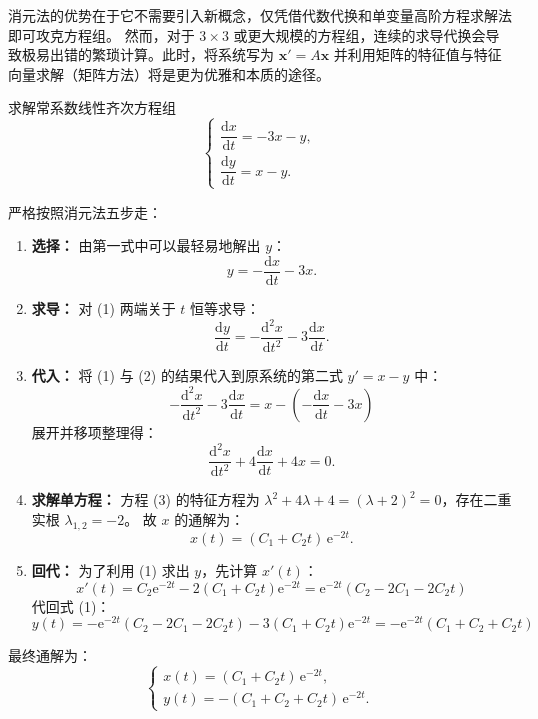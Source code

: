 \documentclass[lang=cn,11pt]{elegantbook}
\begin{document}
\begin{note}[消元法的局限与矩阵法的前瞻]
消元法的优势在于它不需要引入新概念，仅凭借代数代换和单变量高阶方程求解法即可攻克方程组。
然而，对于 $3 \times 3$ 或更大规模的方程组，连续的求导代换会导致极易出错的繁琐计算。此时，将系统写为 $\mathbf{x}'=A\mathbf{x}$ 并利用矩阵的特征值与特征向量求解（矩阵方法）将是更为优雅和本质的途径。
\end{note}


\begin{exercise} \label{ex:sys-elim-ex1}
求解常系数线性齐次方程组
\[
\begin{cases}
\dfrac{\mathrm{d}x}{\mathrm{d}t}=-3x-y,\\[6pt]
\dfrac{\mathrm{d}y}{\mathrm{d}t}=x-y.
\end{cases}
\]
\end{exercise}
\begin{solution}
严格按照消元法五步走：
\begin{enumerate}
    \item \textbf{选择：} 由第一式中可以最轻易地解出 $y$：
    \[
    y=-\frac{\mathrm{d}x}{\mathrm{d}t}-3x. \tag{1}
    \]
    \item \textbf{求导：} 对 (1) 两端关于 $t$ 恒等求导：
    \[
    \frac{\mathrm{d}y}{\mathrm{d}t}=-\frac{\mathrm{d}^{2}x}{\mathrm{d}t^{2}}-3\frac{\mathrm{d}x}{\mathrm{d}t}. \tag{2}
    \]
    \item \textbf{代入：} 将 (1) 与 (2) 的结果代入到原系统的第二式 $y'=x-y$ 中：
    \[
    -\frac{\mathrm{d}^{2}x}{\mathrm{d}t^{2}}-3\frac{\mathrm{d}x}{\mathrm{d}t} = x-\left(-\frac{\mathrm{d}x}{\mathrm{d}t}-3x\right)
    \]
    展开并移项整理得：
    \[
    \frac{\mathrm{d}^{2}x}{\mathrm{d}t^{2}}+4\frac{\mathrm{d}x}{\mathrm{d}t}+4x=0. \tag{3}
    \]
    \item \textbf{求解单方程：} 方程 (3) 的特征方程为 $\lambda^{2}+4\lambda+4=(\lambda+2)^{2}=0$，存在二重实根 $\lambda_{1,2}=-2$。
    故 $x$ 的通解为：
    \[
    x(t)=(C_1+C_2t)\,\mathrm{e}^{-2t}. \tag{4}
    \]
    \item \textbf{回代：} 为了利用 (1) 求出 $y$，先计算 $x'(t)$：
    \[
    x'(t) = C_2\mathrm{e}^{-2t} - 2(C_1+C_2t)\mathrm{e}^{-2t} = \mathrm{e}^{-2t}(C_2 - 2C_1 - 2C_2t)
    \]
    代回式 (1)：
    \[
    y(t) = -\mathrm{e}^{-2t}(C_2 - 2C_1 - 2C_2t) - 3(C_1+C_2t)\mathrm{e}^{-2t} = -\mathrm{e}^{-2t}(C_1 + C_2 + C_2t)
    \]
\end{enumerate}
最终通解为：
\[
\boxed{
\begin{cases}
x(t)=(C_1+C_2t)\,\mathrm{e}^{-2t},\\[6pt]
y(t)=-(C_1+C_2+C_2t)\,\mathrm{e}^{-2t}.
\end{cases}
}
\]
\end{solution}
\end{document}
